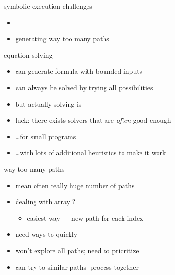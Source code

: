 \begin{comment}
    \begin{itemize}
        \item<2> every variable represented as an \myemph{equation}
        \item<2> final step: generate solution for each path
            \begin{itemize}
                \item 100\% test coverage
            \end{itemize}
    \end{itemize}
\imagecredit{Adapted from Hicks, ``Symbolic Execution for Finding Bugs''}
\end{frame}
\end{comment}


\begin{frame}{symbolic execution challenges}
    \begin{itemize}
        \item {}
        \item generating way too many paths
    \end{itemize}
\end{frame}

\begin{frame}{equation solving}
    \begin{itemize}
        \item can generate formula with bounded inputs
        \item can always be solved by trying all possibilities
            \vspace{.5cm}
        \item but actually solving is 
        \item luck: there exists solvers that are \textit{often} good enough
        \item \ldots for small programs
        \item \ldots with lots of additional heuristics to make it work
    \end{itemize}
\end{frame}
        
\begin{frame}{way too many paths}
    \begin{itemize}
        \item {} mean often really huge number of paths
        \item dealing with array ?
            \begin{itemize}
                \item easiest way --- new path for each index
            \end{itemize}
        \item need ways to quickly 
        \item won't explore all paths; need to prioritize
        \item can try to similar paths; process together
    \end{itemize}
\end{frame}

